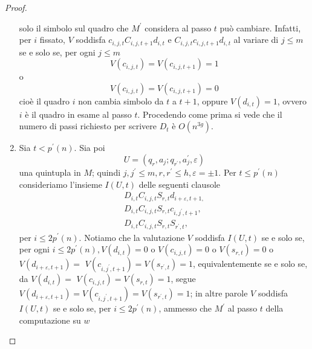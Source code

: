 \begin{proof}
\begin{enumerate}
              solo il simbolo sul quadro che $M^{\prime}$ considera al passo $t$
              può cambiare. Infatti, per $i$ fissato, $V$ soddisfa $c_{i, j, t}
                  C_{i, j, t+1} d_{i, t}$ e $C_{i, j, t} c_{i, j, t+1} d_{i, t}$ al
              variare di $j \leq m$ se e solo se, per ogni $j \leq m$
              $$
                  V\left(c_{i, j, t}\right)=V\left(c_{i, j, t+1}\right)=1
              $$
              o
              $$
                  V\left(c_{i, j, t}\right)=V\left(c_{i, j, t+1}\right)=0
              $$
              cioè il quadro $i$ non cambia simbolo da $t$ a $t+1$, oppure
              $V\left(d_{i, t}\right)=1$, ovvero $i$ è il quadro in esame al
              passo $t$. Procedendo come prima si vede che il numero di passi
              richiesto per scrivere $D_t$ è $O\left(n^{3 g}\right)$.
        \item Sia $t<p^{\prime}(n)$. Sia poi
              $$
                  U=\left(q_r, a_j ; q_{r^{\prime}}, a_j^{\prime}, \varepsilon\right)
              $$
              una quintupla in $M$; quindi $j, j^{\prime} \leq m, r, r^{\prime}
                  \leq h, \varepsilon=\pm 1$. Per $t \leq p^{\prime}(n)$
              consideriamo l'insieme $I(U, t)$ delle seguenti clausole
              $$
                  \begin{gathered}
                      D_{i, t} C_{i, j, t} S_{r, t} d_{i+\varepsilon, t+1,} \\
                      D_{i, t} C_{i, j, t} S_{r, t} c_{i, j^{\prime}, t+1}, \\
                      D_{i, t} C_{i, j, t} S_{r, t} S_{r^{\prime}, t},
                  \end{gathered}
              $$
              per $i \leq 2 p^{\prime}(n)$. Notiamo che la valutazione $V$
              soddisfa $I(U, t)$ se e solo se, per ogni $i \leq 2 p^{\prime}(n),
                  V\left(d_{i, t}\right)=0$ o $V\left(c_{i, j, t}\right)=0$ o
              $V\left(s_{r, t}\right)=0$ o $V\left(d_{i+\varepsilon,
                      t+1}\right)=$ $V\left(c_{i, j^{\prime},
                      t+1}\right)=V\left(s_{\tau^{\prime}, t}\right)=1$,
              equivalentemente se e solo se, da $V\left(d_{i, t}\right)=$
              $V\left(c_{i, j, t}\right)=V\left(s_{r, t}\right)=1$, segue
              $V\left(d_{i+\varepsilon, t+1}\right)=V\left(c_{i, j^{\prime},
                      t+1}\right)=V\left(s_{r^{\prime}, t}\right)=1$; in altre parole
              $V$ soddisfa $I(U, t)$ se e solo se, per $i \leq 2 p^{\prime}(n)$,
              ammesso che $M^{\prime}$ al passo $t$ della computazione su $w$

\end{enumerate}
\end{proof}
